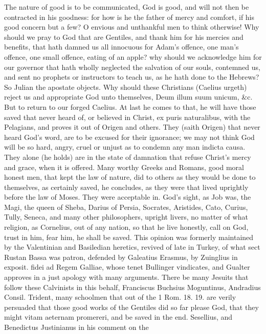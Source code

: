 {The nature of good is to be communicated, God is good, and will not
then be contracted in his goodness: for how is he the father of mercy
and comfort, if his good concern but a few? O envious and unthankful
men to think otherwise! Why should we pray to God that are
Gentiles, and thank him for his mercies and benefits, that hath damned
us all innocuous for Adam's offence, one man's offence, one small
offence, eating of an apple? why should we acknowledge him for our
governor that hath wholly neglected the salvation of our souls,
contemned us, and sent no prophets or instructors to teach us, as he
hath done to the Hebrews? So Julian the apostate objects. Why should
these Christians (Caelius urgeth) reject us and appropriate God unto
themselves, Deum illum suum unicum, \&c. But to return to our forged
Caelius. At last he comes to that, he will have those saved that never
heard of, or believed in Christ, ex puris naturalibus, with the
Pelagians, and proves it out of Origen and others. They (saith
Origen) that never heard God's word, are to be excused for their
ignorance; we may not think God will be so hard, angry, cruel or unjust
as to condemn any man indicta causa. They alone (he holds) are in the
state of damnation that refuse Christ's mercy and grace, when it is
offered. Many worthy Greeks and Romans, good moral honest men, that
kept the law of nature, did to others as they would be done to
themselves, as certainly saved, he concludes, as they were that lived
uprightly before the law of Moses. They were acceptable in. God's
sight, as Job was, the Magi, the queen of Sheba, Darius of Persia,
Socrates, Aristides, Cato, Curius, Tully, Seneca, and many other
philosophers, upright livers, no matter of what religion, as Cornelius,
out of any nation, so that he live honestly, call on God, trust in him,
fear him, he shall be saved. This opinion was formerly maintained by
the Valentinian and Basiledian heretics, revived of late in
Turkey, of what sect Rustan Bassa was patron, defended by
Galeatius Erasmus, by Zuinglius in exposit. fidei ad Regem
Galliae, whose tenet Bullinger vindicates, and Gualter approves in a
just apology with many arguments. There be many Jesuits that follow
these Calvinists in this behalf, Franciscus Buchsius Moguntinus,
Andradius Consil. Trident, many schoolmen that out of the 1 Rom.  18.
19. are verily persuaded that those good works of the Gentiles did so
far please God, that they might vitam aeternam promereri, and be saved
in the end. Sesellius, and Benedictus Justinianus in his comment on the
}
